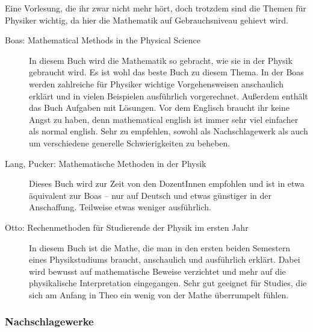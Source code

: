 Eine Vorlesung, die ihr zwar nicht mehr hört, doch trotzdem sind die
Themen für
Physiker wichtig, da hier die Mathematik auf Gebrauchsniveau gehievt
wird.

\begin{description}

\item[Boas: Mathematical Methods in the Physical Science]{
In diesem Buch wird die Mathematik so gebracht, wie sie in der Physik
gebraucht
wird. Es ist wohl das beste Buch zu diesem Thema. In der Boas werden
zahlreiche
für Physiker wichtige Vorgehensweisen anschaulich erklärt und in
vielen
Beispielen ausführlich vorgerechnet. Außerdem enthält das
Buch Aufgaben mit Lösungen. Vor dem Englisch braucht ihr keine Angst zu
haben, denn mathematical english ist immer sehr viel einfacher als
normal
english. Sehr zu empfehlen, sowohl als Nachschlagewerk als auch um
verschiedene
generelle Schwierigkeiten zu beheben.}

\item[Lang, Pucker: Mathematische Methoden in der Physik]{
Dieses Buch wird zur Zeit von den DozentInnen empfohlen und ist in etwa
äquivalent zur Boas -- nur auf Deutsch und etwas günstiger in der
Anschaffung.
Teilweise etwas weniger ausführlich.}



\item[Otto: Rechenmethoden für Studierende der Physik im ersten Jahr]{
In diesem Buch ist die Mathe, die man in den ersten beiden Semestern eines Physikstudiums braucht, anschaulich und ausführlich erklärt. Dabei wird bewusst auf mathematische Beweise verzichtet und mehr auf die physikalische Interpretation eingegangen. Sehr gut geeignet für Studies, die sich am Anfang in Theo ein wenig von der Mathe überrumpelt fühlen.}
\end{description}

\subsubsection*{Nachschlagewerke}

